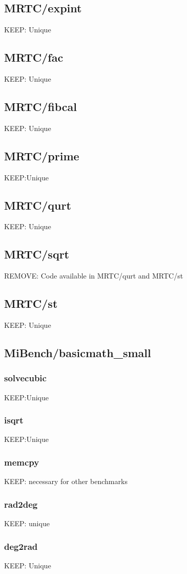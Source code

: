 \documentclass[a4paper]{article}
\begin{document}
\subsection{MRTC/expint}
	KEEP: Unique
\subsection{MRTC/fac}
	KEEP: Unique
\subsection{MRTC/fibcal}
	KEEP: Unique
\subsection{MRTC/prime}
	KEEP:Unique
\subsection{MRTC/qurt}
	KEEP: Unique
\subsection{MRTC/sqrt}
	REMOVE: Code available in MRTC/qurt and MRTC/st
\subsection{MRTC/st}
	KEEP: Unique
\subsection{MiBench/basicmath\_small}
    \subsubsection{solvecubic}
    	KEEP:Unique
    \subsubsection{isqrt}
    	KEEP:Unique
    \subsubsection{memcpy}
    	KEEP: necessary for other benchmarks
    \subsubsection{rad2deg}
    	KEEP: unique
    \subsubsection{deg2rad}
    	KEEP: Unique
\end{document}
